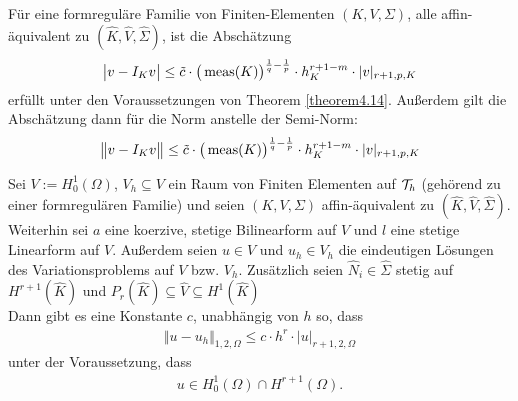 \begin{theorem}\label{theorem4.16}
	Für eine formreguläre Familie von Finiten-Elementen $(K,V,\Sigma)$, alle affin-äquivalent zu $(\hat{K},\hat{V},\hat{\Sigma})$, ist die Abschätzung
	\begin{align*}
		\big| v-I_K v\big|\leq\tilde{c}\cdot\big(\operatorname{meas}(K)\big)^{\frac{1}{q}-\frac{1}{p}}\cdot h_K^{r+1-m}\cdot|v|_{r+1,p,K}
	\end{align*}
	erfüllt unter den Voraussetzungen von Theorem \ref{theorem4.14}. Außerdem gilt die Abschätzung dann für die Norm anstelle der Semi-Norm:
	\begin{align*}
		\big\Vert v-I_K v\big\Vert\leq\tilde{c}\cdot\big(\operatorname{meas}(K)\big)^{\frac{1}{q}-\frac{1}{p}}\cdot h_K^{r+1-m}\cdot|v|_{r+1,p,K}
	\end{align*}
\end{theorem}

\begin{theorem}\label{theorem4.17}
	Sei $V:=H_0^1(\Omega)$, $V_h\subseteq V$ ein Raum von Finiten Elementen auf $\mathcal{T}_h$ (gehörend zu einer formregulären Familie)  und seien $(K,V,\Sigma)$ affin-äquivalent zu $(\hat{K},\hat{V},\hat{\Sigma})$.\\
	Weiterhin sei $a$ eine koerzive, stetige Bilinearform auf $V$ und $l$ eine stetige Linearform auf $V$.
	Außerdem seien $u\in V$ und $u_h\in V_h$ die 	eindeutigen Lösungen des Variationsproblems auf $V$ bzw. $V_h$.
	Zusätzlich seien $\hat{N}_i\in\hat{\Sigma}$ stetig auf $H^{r+1}(\hat{K})$ und $P_r(\hat{K})\subseteq\hat{V}\subseteq H^1(\hat{K})$\\
	Dann gibt es eine Konstante $c$, unabhängig von $h$ so, dass 
	\begin{align*}
		\Vert u-u_h\Vert_{1,2,\Omega}\leq c\cdot h^r\cdot|u|_{r+1,2,\Omega}
	\end{align*}
	unter der Voraussetzung, dass
	\begin{align*}
		u\in H^1_0(\Omega)\cap H^{r+1}(\Omega).
	\end{align*}
\end{theorem}

